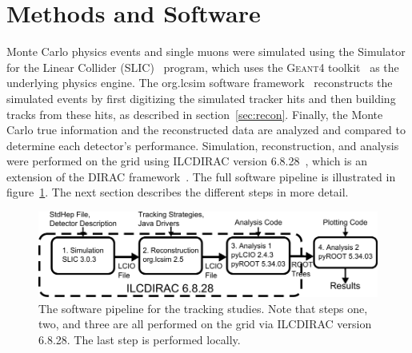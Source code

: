 \section{Methods and Software}
Monte Carlo physics events and single muons
were simulated using the Simulator for the Linear Collider (SLIC)~\cite{graf2007simulator} program,
which uses the G\textsc{eant}4 toolkit~\cite{agostinelli2003geant4,allison2006geant4}
as the underlying physics engine.
The org.lcsim software framework~\cite{lcsimurl,graf2011org} reconstructs the simulated events
 by first digitizing the simulated tracker hits and then building tracks from these hits,
as described in section~\ref{sec:recon}.
Finally, the Monte Carlo true information and the reconstructed data are 
analyzed and compared to determine each detector's performance.
Simulation, reconstruction, and analysis were performed on the grid
using ILCDIRAC version 6.8.28~\cite{1742-6596-513-3-032077}, 
which is an extension of the DIRAC framework~\cite{tsaregorodtsev2008dirac}.
The full software pipeline is illustrated in figure~\ref{fig:software}.
The next section describes the different steps in more detail.
\begin{figure}[b]
\centering
\includegraphics{simReconAnalysisPipeline.pdf}
\caption{The software pipeline for the tracking studies.
Note that steps one, two, and three are all performed on the grid via ILCDIRAC
version 6.8.28.
The last step is performed locally.}
\label{fig:software}
\end{figure}
